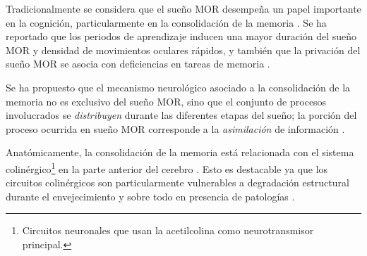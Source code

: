 \documentclass[12pt,letterpaper]{book}
\begin{document}
Tradicionalmente se considera que el sueño MOR desempeña un papel importante en la cognición, particularmente en la consolidación de la memoria \cite{Corsi1983}.
%
Se ha reportado que los periodos de aprendizaje inducen una mayor duración del sueño MOR y densidad de movimientos oculares rápidos, y también que la privación del sueño MOR se asocia con deficiencias en tareas de memoria \cite{smith96,smith01}.


Se ha propuesto que el mecanismo neurológico asociado a la consolidación de la memoria no es exclusivo del sueño MOR, sino que el conjunto de procesos involucrados se \textit{distribuyen} durante las diferentes etapas del sueño;
la porción del proceso ocurrida en sueño MOR corresponde a la \textit{asimilación} de información \cite{diekelmann10}.
%

Anatómicamente, la consolidación de la memoria está relacionada con el sistema colinérgico\footnote{Circuitos neuronales que usan la acetilcolina como neurotransmisor principal.} en la parte anterior del cerebro 
\cite{Blake}.
%
Esto es destacable ya que los 
circuitos colinérgicos son particularmente vulnerables a degradación estructural durante el envejecimiento y sobre todo en presencia de patologías \cite{Schliebs11}.


%
%
\end{document}
